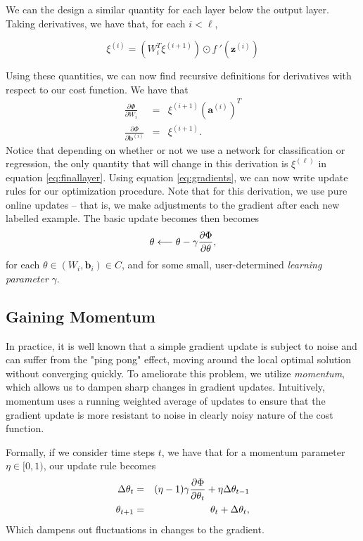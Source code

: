 We can the design a similar quantity for each layer below the output layer. Taking derivatives, we have that, for each $i< \ell$,

\begin{equation}
\label{update1}
\xi^{(i)} = (W_i^T\xi^{(i+1)})\odot f\:'(\mathbf{z}^{(i)})
\end{equation}

Using these quantities, we can now find recursive definitions for derivatives with respect to our cost function. We have that 
\begin{eqnarray}
\label{eq:gradients}
\frac{\partial\Phi}{\partial W_i} &=& \xi^{(i+1)}(\mathbf{a}^{(i)})^T\\
\frac{\partial\Phi}{\partial \mathbf{b}^{(i)}} &=& \xi^{(i+1)}.
\end{eqnarray}
Notice that depending on whether or not we use a network for classification or regression, the only quantity that will change in this derivation is $\xi^{(\ell)}$ in equation \eqref{eq:finallayer}. Using equation \eqref{eq:gradients}, we can now write update rules for our optimization procedure. Note that for this derivation, we use pure online updates -- that is, we make adjustments to the gradient after each new labelled example. The basic update becomes then becomes
\begin{equation}
\theta \longleftarrow \theta - \gamma \frac{\partial \Phi}{\partial \theta},
\end{equation}
for each $\theta\in(W_i, \mathbf{b}_i)\in C$, and for some small, user-determined \emph{learning parameter} $\gamma$.

\subsection{Gaining Momentum}

In practice, it is well known that a simple gradient update is subject to noise and can suffer from the "ping pong" effect, moving around the local optimal solution without converging quickly. To ameliorate this problem, we utilize \emph{momentum}, which allows us to dampen sharp changes in gradient 
updates. Intuitively, momentum uses a running weighted average of updates to ensure that the gradient update is more resistant to noise in clearly noisy nature of the cost function. 

Formally, if we consider time steps $t$, we have that for a momentum parameter $\eta\in[0,1)$, our update rule becomes 
\begin{eqnarray}
\Delta\theta_{t} &=& (\eta - 1)\gamma\frac{\partial \Phi}{\partial \theta_t} + \eta\Delta\theta_{t - 1}\\
\theta_{t+1} &=& \theta_t + \Delta\theta_{t},
\end{eqnarray}
Which dampens out fluctuations in changes to the gradient.



